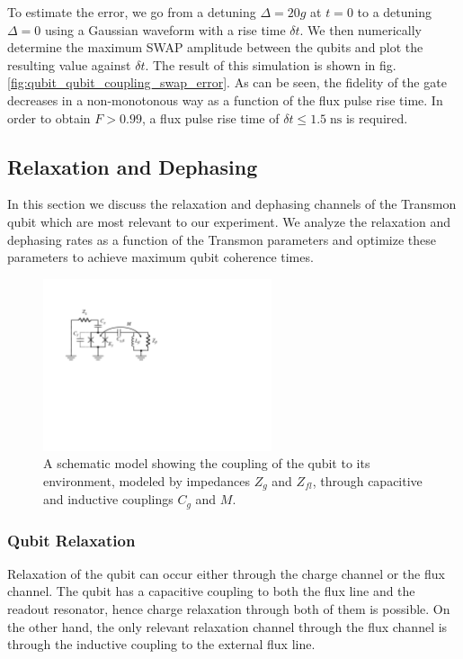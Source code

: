 To estimate the error, we go from a detuning $\Delta = 20 g$ at $t=0$ to a detuning $\Delta=0$ using a Gaussian waveform with a rise time $\delta t$. We then numerically determine the maximum SWAP amplitude between the qubits and plot the resulting value against $\delta t$. The result of this simulation is shown in fig. \ref{fig:qubit_qubit_coupling_swap_error}. As can be seen, the fidelity of the gate decreases in a non-monotonous way as a function of the flux pulse rise time. In order to obtain $F>0.99$, a flux pulse rise time of $\delta t \le 1.5\;\mathrm{ns}$ is required.

\subsection{Relaxation and Dephasing}

In this section we discuss the relaxation and dephasing channels of the Transmon qubit which are most relevant to our experiment. We analyze the relaxation and dephasing rates as a function of the Transmon parameters and optimize these parameters to achieve maximum qubit coherence times.

\begin{figure}
	\centering
	\includegraphics[width=0.6\textwidth]{./material/figures/introduction/cooper_pair_box_decoherence}
	\caption[]{A schematic model showing the coupling of the qubit to its environment, modeled by impedances $Z_g$ and $Z_{fl}$, through capacitive and inductive couplings $C_g$ and $M$.}
	\label{fig:cooper_pair_box_decoherence}
\end{figure}

\subsubsection{Qubit Relaxation}

Relaxation of the qubit can occur either through the charge channel or the flux channel. The qubit has a capacitive coupling to both the flux line and the readout resonator, hence charge relaxation through both of them is possible. On the other hand, the only relevant relaxation channel through the flux channel is through the inductive coupling to the external flux line.

